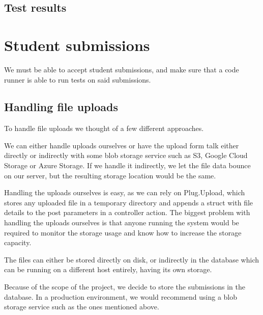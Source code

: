 
\subsection{Test results}

\section{Student submissions}

We must be able to accept student submissions, and make sure that a code runner is able to run tests on said submissions.

\subsection{Handling file uploads}

To handle file uploads we thought of a few different approaches.

We can either handle uploads ourselves or have the upload form talk either directly or indirectly with some blob storage service such as S3, Google Cloud Storage or Azure Storage. If we handle it indirectly, we let the file data bounce on our server, but the resulting storage location would be the same.

Handling the uploads ourselves is easy, as we can rely on Plug.Upload, which stores any uploaded file in a temporary directory and appends a struct with file details to the post parameters in a controller action. The biggest problem with handling the uploads ourselves is that anyone running the system would be required to monitor the storage usage and know how to increase the storage capacity.

The files can either be stored directly on disk, or indirectly in the database which can be running on a different host entirely, having its own storage.

Because of the scope of the project, we decide to store the submissions in the database. In a production environment, we would recommend using a blob storage service such as the ones mentioned above.

